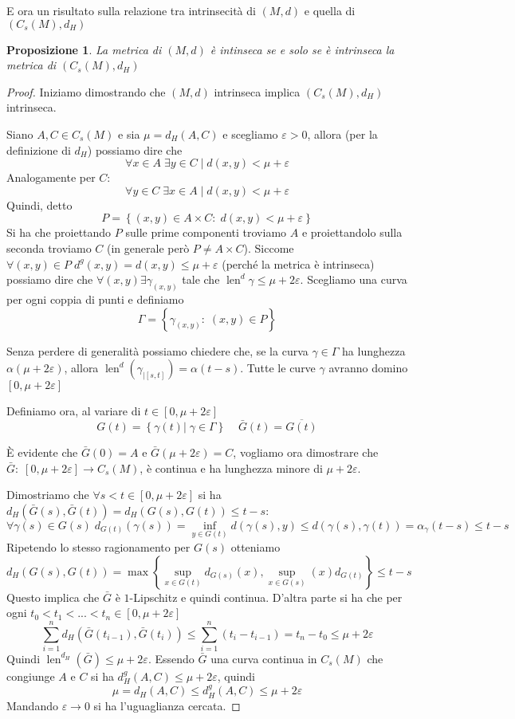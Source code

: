 \documentclass[a4paper,10pt]{article}
\newcounter{counter1}
\theoremstyle{plain}
\newtheorem{mypro}[counter1]{Proposizione}
\theoremstyle{definition}
\theoremstyle{remark}
\newcommand{\obar}[1]{\overline{#1}}
\newcommand{\set}[1]{\left\{#1\right\}}
\newcommand{\pa}[1]{\left(#1\right)}
\newcommand{\bra}[1]{\left[#1\right]}
\DeclareMathOperator{\len}{len}
\begin{document}
E ora un risultato sulla relazione tra intrinsecità di $(M,d)$ e
quella di $\pa{C_s(M),d_H}$
\begin{mypro}
  La metrica di $(M,d)$ è intinseca se e solo se è intrinseca la
  metrica di $(C_s(M),d_H)$
\end{mypro}
\begin{proof}
  Iniziamo dimostrando che $(M,d)$ intrinseca implica $(C_s(M),d_H)$
  intrinseca.

  Siano $A,C \in C_s(M)$ e sia $\mu = d_H(A,C)$ e scegliamo
  $\varepsilon >0$, allora (per la definizione di $d_H$) possiamo dire
  che
  \[ \forall x \in A\; \exists y \in C \mid d(x,y) < \mu +
  \varepsilon \]
  Analogamente per $C$:
  \[ \forall y \in C\; \exists x \in A \mid d(x,y) < \mu +
  \varepsilon \]
  Quindi, detto
  \[ P = \set{(x,y)\in A\times C:\; d(x,y) < \mu + \varepsilon} \]
  Si ha che proiettando $P$ sulle prime componenti troviamo $A$ e
  proiettandolo sulla seconda troviamo $C$ (in generale però $P \neq A
  \times C$).  Siccome $\forall (x,y) \in P\; d^g(x,y) = d(x,y) \le \mu
  + \varepsilon$ (perché la metrica è intrinseca) possiamo dire che
  $\forall (x,y) \exists \gamma_{(x,y)}$ tale che $\len ^d \gamma \le
  \mu + 2 \varepsilon$. Scegliamo una curva per ogni coppia di punti e
  definiamo
  \[ \Gamma = \set{\gamma _{(x,y)} :\; (x,y) \in P} \]

  Senza perdere di generalità possiamo chiedere che, se la curva
  $\gamma \in \Gamma$ ha lunghezza $\alpha (\mu + 2
  \varepsilon )$, allora $\len ^d \pa{ \gamma _{|\bra{s,t}}} = \alpha
  (t-s)$. Tutte le curve $\gamma$ avranno domino $\bra{0,\mu
    + 2 \varepsilon}$

  Definiamo ora, al variare di $t\in \bra{0,\mu + 2 \varepsilon}$
  \[ G(t) = \set{\gamma (t) | \; \gamma \in \Gamma} \;\;\;\; \bar G(t)
  = \obar{ G(t)} \]

  \`E evidente che $\bar G(0) = A$ e $\bar G(\mu + 2 \varepsilon) =
  C$, vogliamo ora dimostrare che $\bar G:\; \bra{0,\mu + 2
    \varepsilon} \to C_s(M)$, \`e continua e ha lunghezza minore di
  $\mu + 2 \varepsilon$.
  
  Dimostriamo che $\forall s<t \in \bra{0,\mu + 2 \varepsilon}$ si ha
  $d_H(\bar G(s),\bar G(t)) = d_H(G(s),G(t)) \le t-s$:
  \[ \forall \gamma(s) \in G(s) \; d_{G(t)}(\gamma(s)) = \inf _{y \in
    G(t)} d(\gamma(s),y) \le d(\gamma(s),\gamma(t)) = \alpha
  _{\gamma} (t-s) \le t-s \]
  Ripetendo lo stesso ragionamento per $G(s)$ otteniamo
  \[ d_H(G(s), G(t)) = \max\set{\sup_{x\in G(t)} d_{G(s)}(x) , \sup
    _{x\in G(s)} (x) d_{G(t)} } \le t-s \]
  Questo implica che $\bar G$ è $1$-Lipschitz e quindi
  continua. D'altra parte si ha che per ogni $t_0< t_1< ... < t_n \in
  \bra{0,\mu + 2 \varepsilon}$ 
  \[ \sum _{i=1} ^n d_H(\bar G(t_{i-1}), \bar G(t_i)) \le \sum _{i=1}
  ^n (t_i - t_{i-1}) = t_n - t_0 \le \mu + 2\varepsilon \]
  Quindi $\len ^{d_H}(\bar G) \le \mu + 2 \varepsilon$.
  Essendo $\bar G$ una curva continua in $C_s(M)$ che congiunge $A$ e
  $C$ si ha $d_H ^g (A,C) \le \mu + 2\varepsilon $, quindi
  \[ \mu = d_H (A,C) \le d_H^g(A,C) \le \mu + 2\varepsilon \]
  Mandando $\varepsilon \to 0$ si ha l'uguaglianza cercata.


\end{proof}
\end{document}
